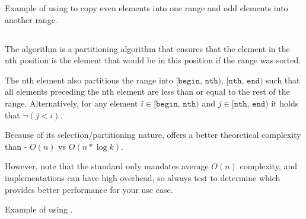 \begin{codebox}[]{\href{https://compiler-explorer.com/z/nzrbczh4j}{\ExternalLink}}
\footnotesize Example of using  to copy even elements into one range and odd elements into another range.
\tcblower
{}
\end{codebox}

\subsection{\texorpdfstring{}{\texttt{std::nth\_element}}}

The  algorithm is a partitioning algorithm that ensures that the element in the nth position is the element that would be in this position if the range was sorted.

The nth element also partitions the range into $\texttt{[begin, nth)}$, $\texttt{[nth, end)}$ such that all elements preceding the nth element are less than or equal to the rest of the range. Alternatively, for any element $i \in \texttt{[begin, nth)}$ and $j \in \texttt{[nth, end)}$ it holds that $\neg (j < i)$.



Because of its selection/partitioning nature,  offers a better theoretical complexity than  - $O(n)$ vs $O(n*\log k)$.

However, note that the standard only mandates average $O(n)$ complexity, and  implementations can have high overhead, so always test to determine which provides better performance for your use case.

\begin{codebox}[]{\href{https://compiler-explorer.com/z/n7T3h5sM8}{\ExternalLink}}
\footnotesize Example of using .
\tcblower
{}
\end{codebox}